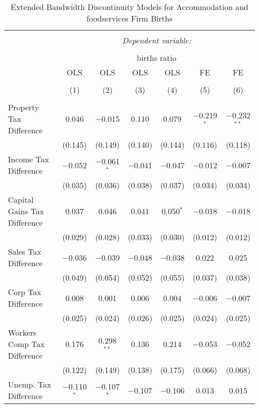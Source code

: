 
\begin{table}[!htbp] \centering 
  \caption{Extended Bandwidth Discontinuity Models for  Accommodation and foodservices Firm Births} 
  \label{72rd} 
\begin{tabular}{@{\extracolsep{5pt}}lcccccc} 
\\[-1.8ex]\hline 
\hline \\[-1.8ex] 
 & \multicolumn{6}{c}{\textit{Dependent variable:}} \\ 
\cline{2-7} 
\\[-1.8ex] & \multicolumn{6}{c}{births ratio} \\ 
 & OLS & OLS & OLS & OLS & FE & FE \\ 
\\[-1.8ex] & (1) & (2) & (3) & (4) & (5) & (6)\\ 
\hline \\[-1.8ex] 
 Property Tax Difference & 0.046 & $-$0.015 & 0.110 & 0.079 & $-$0.219$^{*}$ & $-$0.232$^{**}$ \\ 
  & (0.145) & (0.149) & (0.140) & (0.144) & (0.116) & (0.118) \\ 
  Income Tax Difference & $-$0.052 & $-$0.061$^{*}$ & $-$0.041 & $-$0.047 & $-$0.012 & $-$0.007 \\ 
  & (0.035) & (0.036) & (0.038) & (0.037) & (0.034) & (0.034) \\ 
  Capital Gains Tax Difference & 0.037 & 0.046 & 0.041 & 0.050$^{*}$ & $-$0.018 & $-$0.018 \\ 
  & (0.029) & (0.028) & (0.033) & (0.030) & (0.012) & (0.012) \\ 
  Sales Tax Difference & $-$0.036 & $-$0.039 & $-$0.048 & $-$0.038 & 0.022 & 0.025 \\ 
  & (0.049) & (0.054) & (0.052) & (0.055) & (0.037) & (0.038) \\ 
  Corp Tax Difference & 0.008 & 0.001 & 0.006 & 0.004 & $-$0.006 & $-$0.007 \\ 
  & (0.025) & (0.024) & (0.026) & (0.025) & (0.024) & (0.025) \\ 
  Workers Comp Tax Difference & 0.176 & 0.298$^{**}$ & 0.136 & 0.214 & $-$0.053 & $-$0.052 \\ 
  & (0.122) & (0.149) & (0.138) & (0.175) & (0.066) & (0.068) \\ 
  Unemp. Tax Difference & $-$0.110$^{*}$ & $-$0.107$^{*}$ & $-$0.107 & $-$0.106 & 0.013 & 0.015 \\ 

\end{tabular}
\end{table}
